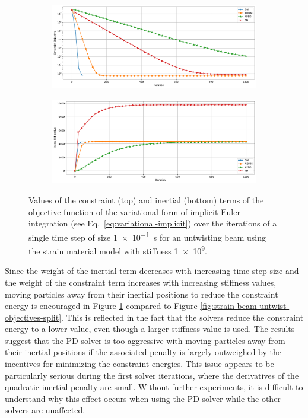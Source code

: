 \begin{figure}[h]
    \centering
    \begin{subfigure}{\textwidth}
        \includegraphics[width=\linewidth]{figures/strain_beam_untwist_constraintObjectives_large_ts.pdf}
    \end{subfigure}
    \begin{subfigure}{\textwidth}
        \includegraphics[width=\linewidth]{figures/strain_beam_untwist_inertialObjectives_large_ts.pdf}
    \end{subfigure}
    \caption{Values of the constraint (top) and inertial (bottom) terms of the objective function of the variational form of implicit Euler integration 
        (see Eq.\ \ref{eq:variational-implicit}) over the iterations of a single time step of size \SI{1e-1}{\second} for an untwisting beam using the strain material 
        model with stiffness \num{1e9}.}
    \label{fig:strain-beam-untwist-objectives-split-large-ts}
\end{figure}

Since the weight of the inertial term decreases with increasing time step size and the weight of the constraint term increases with increasing stiffness values, moving 
particles away from their inertial positions to reduce the constraint energy is encouraged in Figure \ref{fig:strain-beam-untwist-objectives-split-large-ts} compared to
Figure \ref{fig:strain-beam-untwist-objectives-split}. This is reflected in the fact that the solvers reduce the constraint energy to a lower value, even though a larger 
stiffness value is used. The results suggest that the PD solver is too aggressive with moving particles away from their inertial positions if the associated penalty 
is largely outweighed by the incentives for minimizing the constraint energies. This issue 
appears to be particularly serious during the first solver iterations, where the derivatives of the quadratic inertial penalty are small. 
Without further experiments, it is difficult to understand why this effect occurs when using the PD solver while the other solvers are unaffected.

